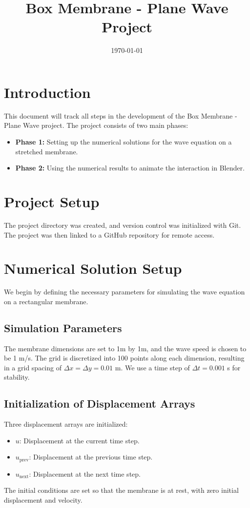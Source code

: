 \documentclass{article}
\begin{document}
\title{Box Membrane - Plane Wave Project}
\author{}
\date{\today}
\maketitle

\section{Introduction}
This document will track all steps in the development of the Box Membrane - Plane Wave project. The project consists of two main phases:
\begin{itemize}
    \item \textbf{Phase 1:} Setting up the numerical solutions for the wave equation on a stretched membrane.
    \item \textbf{Phase 2:} Using the numerical results to animate the interaction in Blender.
\end{itemize}

\section{Project Setup}
The project directory was created, and version control was initialized with Git. The project was then linked to a GitHub repository for remote access.

\section{Numerical Solution Setup}

We begin by defining the necessary parameters for simulating the wave equation on a rectangular membrane.

\subsection{Simulation Parameters}
The membrane dimensions are set to 1m by 1m, and the wave speed is chosen to be 1 m/s. The grid is discretized into 100 points along each dimension, resulting in a grid spacing of $\Delta x = \Delta y = 0.01$ m. We use a time step of $\Delta t = 0.001$ s for stability. 

\subsection{Initialization of Displacement Arrays}
Three displacement arrays are initialized:
\begin{itemize}
    \item $u$: Displacement at the current time step.
    \item $u_{\text{prev}}$: Displacement at the previous time step.
    \item $u_{\text{next}}$: Displacement at the next time step.
\end{itemize}

The initial conditions are set so that the membrane is at rest, with zero initial displacement and velocity.
\end{document}
